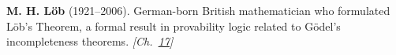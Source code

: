 \textbf{M. H. Löb} (1921–2006). German-born British mathematician who formulated L\"{o}b's Theorem, a formal result in provability logic related to G\"{o}del's incompleteness theorems. \emph{[Ch.~\hyperref[ch:bignumbers]{17}]}


